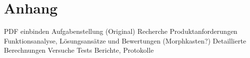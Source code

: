 


\section{Anhang}
 


PDF einbinden
Aufgabenstellung (Original)
Recherche
Produktanforderungen
Funktionsanalyse, Lösungsansätze und Bewertungen (Morphkasten?)
Detaillierte Berechnungen
Versuche Tests
Berichte, Protokolle


